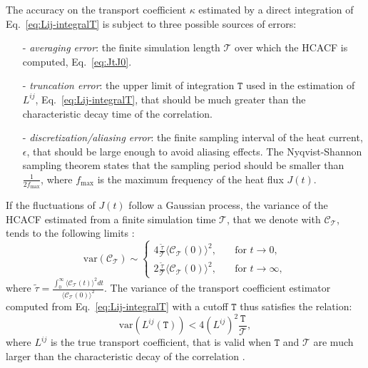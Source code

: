 \begin{LEtext}
The accuracy on the transport coefficient $\kappa$ estimated by a direct integration of Eq.~\eqref{eq:Lij-integralT} is subject to three possible sources of errors:
\begin{itemize}
    \item[-] \emph{averaging error}: the finite simulation length $\mathcal{T}$ over which the HCACF is computed, Eq.~\eqref{eq:JtJ0}.
    \item[-] \emph{truncation error}: the upper limit of integration $\mathtt{T}$ used in the estimation of $L^{ij}$, Eq.~\eqref{eq:Lij-integralT}, that should be much greater than the characteristic decay time of the correlation.
    \item[-] \emph{discretization/aliasing error}: the finite sampling interval of the heat current, $\epsilon$, that should be large enough to avoid aliasing effects. The Nyqvist-Shannon sampling theorem \cite{Oppenheim1999} states that the sampling period should be smaller than $\frac{1}{2f_\mathrm{max}}$, where $f_\mathrm{max}$ is the maximum frequency of the heat flux $J(t)$.
\end{itemize}
If the fluctuations of $J(t)$ follow a Gaussian process, the variance of the HCACF estimated from a finite simulation time $\mathcal{T}$, that we denote with $\mathcal{C}_\mathcal{T}$, tends to the following limits \cite{Jones2012}:
\begin{equation}
    \mathrm{var} \left(\mathcal{C}_\mathcal{T}\right) \sim \left\{
    \begin{aligned}
        4 \frac{\tilde\tau}{\mathcal{T}} \langle \mathcal{C}_\mathcal{T}(0) \rangle^2 , \quad &\text{for }t\rightarrow 0 , \\
        2 \frac{\tilde\tau}{\mathcal{T}} \langle \mathcal{C}_\mathcal{T}(0) \rangle^2 , \quad &\text{for }t\rightarrow \infty ,
    \end{aligned} \right.
\end{equation}
where $\tilde\tau = \frac{\int_0^\infty \langle \mathcal{C}_\mathcal{T}(t) \rangle^2 dt}{\langle \mathcal{C}_\mathcal{T}(0) \rangle^2}$. The variance of the transport coefficient estimator computed from Eq.~\eqref{eq:Lij-integralT} with a cutoff $\mathtt{T}$ thus satisfies the relation:
\begin{equation}
    \mathrm{var} \left(L^{ij}(\mathtt{T})\right) < 4 \left(L^{ij}\right)^2 \frac{\mathtt{T}}{\mathcal{T}} ,
\end{equation}
where $L^{ij}$ is the true transport coefficient, that is valid when $\mathtt{T}$ and $\mathcal{T}$ are much larger than the characteristic decay of the correlation \cite{Jones2012}.


\end{LEtext}

